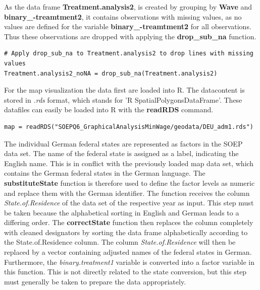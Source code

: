 \documentclass[a4paper]{article}
\begin{document}
{As the data frame \textbf{Treatment.analysis2}, is created by grouping by \textbf{Wave} and \textbf{binary\_-treamtment2}, it contains observations with missing values, as no values are defined for the variable \textbf{binary\_-treamtment2} for all observations. Thus these observations are dropped with applying the \textbf{drop\_sub\_na} function.
\begin{lstlisting}
# Apply drop_sub_na to Treatment.analysis2 to drop lines with missing values
Treatment.analysis2_noNA = drop_sub_na(Treatment.analysis2)
\end{lstlisting}
For the map visualization the data first are loaded into R. The datacontent is stored in \textit{.rds} format, which stands for 'R SpatialPolygonsDataFrame'. These datafiles can easily be loaded into R with the \textbf{readRDS} command.
\begin{lstlisting}
map = readRDS("SOEPQ6_GraphicalAnalysisMinWage/geodata/DEU_adm1.rds")
\end{lstlisting}
The individual German federal states are represented as factors in the SOEP data set. The name of the federal state is assigned as a label, indicating the English name. This is in conflict with the previously loaded map data set, which contains the German federal states in the German language. The \textbf{substituteState} function is therefore used to define the factor levels as numeric and replace them with the German identifier. The function receives the column \textit{State.of.Residence} of the data set of the respective year as input. This step must be taken because the alphabetical sorting in English and German leads to a differing order. The \textbf{correctState} function then replaces the column completely with cleaned designators by sorting the data frame alphabetically according to the State.of.Residence column. The column \textit{State.of.Residence} will then be replaced by a vector containing adjusted names of the federal states in German. Furthermore, the \textit{binary.treatment1} variable is converted into a factor variable in this function. This is not directly related to the state conversion, but this step must generally be taken to prepare the data appropriately.

}
\end{document}
